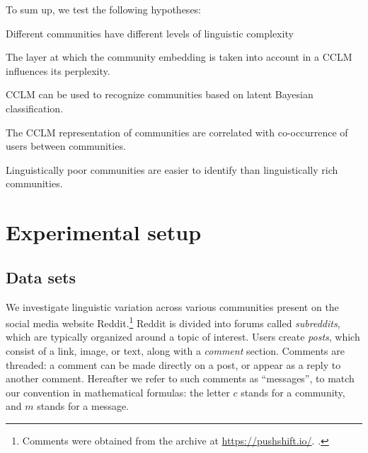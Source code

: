 \documentclass[11pt,a4paper]{article}
\newcommand\jp[1]{\todo[backgroundcolor=blue!10]{JP: #1}}
\begin{document}
To sum up, we test the following hypotheses:
\begin{hypotheses}
\item \label{hyp:varying-complexity} Different communities have different levels of linguistic
  complexity
\item \label{hyp:layer-effect} The layer at which the community embedding is taken into account
  in a CCLM influences its perplexity.
\item \label{hyp:LMCC-works} CCLM can be used to recognize communities based on
  latent Bayesian classification.
\item \label{hyp:extra-linguistic-correlation} The CCLM representation of communities are correlated with
  co-occurrence of users between communities.
\item \label{hyp:rich-harder-to-identify} Linguistically poor communities are easier to identify than
  linguistically rich communities.
\end{hypotheses}

\jp{Perhaps: Outline of the paper.}

\section{Experimental setup}

\subsection{Data sets}

We investigate linguistic variation across various communities present
on the social media website Reddit.\footnote{Comments were obtained
  from the archive at \url{https://pushshift.io/}.
  \cite{Baumgartner2020}.}
%
Reddit is divided into forums called \textit{subreddits}, 
which are typically organized around a topic of interest. 
Users create \textit{posts}, which consist of a link, image, 
or text, along with a \emph{comment} section. 
Comments are threaded: a comment can be made directly on a post,
or appear as a reply to another comment.
%
Hereafter we refer to such comments as ``messages'', to match our
convention in mathematical formulas: the letter $c$ stands for a
community, and $m$ stands for a message.
\end{document}
